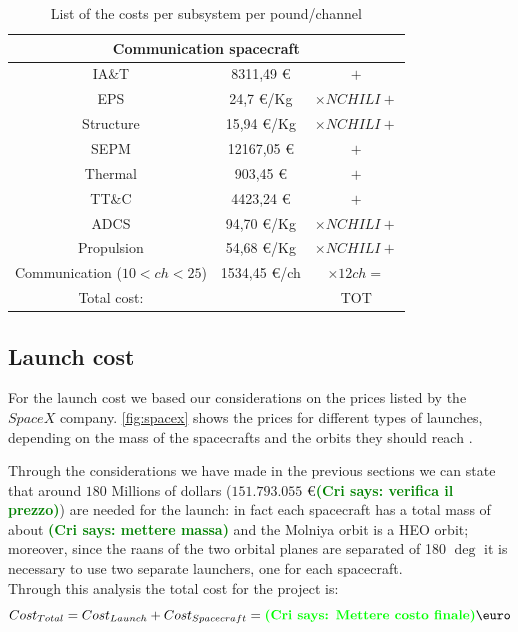 \documentclass[11pt,a4paper,titlepage]{article}
\newcommand{\cri}[1]{\textcolor{green}{\textbf{(Cri says: #1)}}}
\begin{document}
		\begin{table}
			\centering
			\begin{tabular}{ccc}
			\toprule
			\multicolumn{3}{c}{Communication spacecraft}\\
			\midrule
			IA\&T       & 8311,49 \euro       & $+$\\
			EPS          & 24,7 \euro/Kg        & $\times NCHILI +$\\
			Structure   & 15,94  \euro/Kg     & $\times NCHILI +$\\
			SEPM        & 12167,05 \euro     & $+$\\
			Thermal    & 903,45 \euro        & $+$\\
			TT\&C       & 4423,24 \euro      & $+$\\ 
			ADCS        & 94,70 \euro/Kg     & $\times NCHILI +$\\
			Propulsion & 54,68   \euro/Kg   & $\times NCHILI +$\\
			Communication ($10 < ch < 25$) & 1534,45 \euro/ch & $\times 12 ch =$\\
			\bottomrule
			Total cost:& & TOT\\
			\end{tabular}
			\caption{List of the costs per subsystem per pound/channel}
			\label{tab:cost}
		\end{table}
	\subsection{Launch cost}
For the launch cost we based our considerations on the prices listed by the $SpaceX$ company. \autoref{fig:spacex} shows the prices for different types of launches, depending on the mass of the spacecrafts and the orbits they should reach \cite{spacex}.

Through the considerations we have made in the previous sections we can state that around $180$ Millions of dollars ($151.793.055$ \euro \cri{verifica il prezzo}) are needed for the launch: in fact each spacecraft has a total mass of about \cri{mettere massa} and the Molniya orbit is a HEO orbit; moreover, since the raans of the two orbital planes are separated of 180 $\deg$ it is necessary to use two separate launchers, one for each spacecraft.\\

Through this analysis the total cost for the project is:
\begin{equation}
Cost_{Total} = Cost_{Launch} + Cost_{Spacecraft} = \cri{Mettere costo finale} \text{\euro}
\end{equation}
\end{document}
